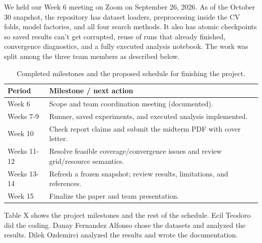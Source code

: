 \documentclass[12pt,letterpaper]{article}
\begin{document}
We held our Week 6 meeting on Zoom on September 26, 2026. As of the October 30 snapshot, the repository has dataset loaders, preprocessing inside the CV folds, model factories, and all four search methods. It also has atomic checkpoints so saved results can't get corrupted, reuse of runs that already finished, convergence diagnostics, and a fully executed analysis notebook. The work was split among the three team members as described below.

\begin{table}[t]
\centering
\caption{Completed milestones and the proposed schedule for finishing the project.}
\label{tab:timeline}
\fontsize{10}{12}\selectfont
\setlength{\tabcolsep}{3.3pt}
\begin{tabular}{p{}p{}}
\toprule
Period & Milestone / next action \\
\midrule
Week 6 & Scope and team coordination meeting (documented). \\
Weeks 7-9 & Runner, saved experiments, and executed analysis implemented. \\
Week 10 & Check report claims and submit the midterm PDF with cover letter. \\
Weeks 11-12 & Resolve feasible coverage/convergence issues and review grid/resource semantics. \\
Weeks 13-14 & Refresh a frozen snapshot; review results, limitations, and references. \\
Week 15 & Finalize the paper and team presentation. \\
\bottomrule
\end{tabular}
\end{table}

Table X shows the project milestones and the rest of the schedule. Ecil Teodoro did the coding. Danay Fernandez Alfonso chose the datasets and analyzed the results. Dilek Ozdemirci analyzed the results and wrote the documentation.
\end{document}
